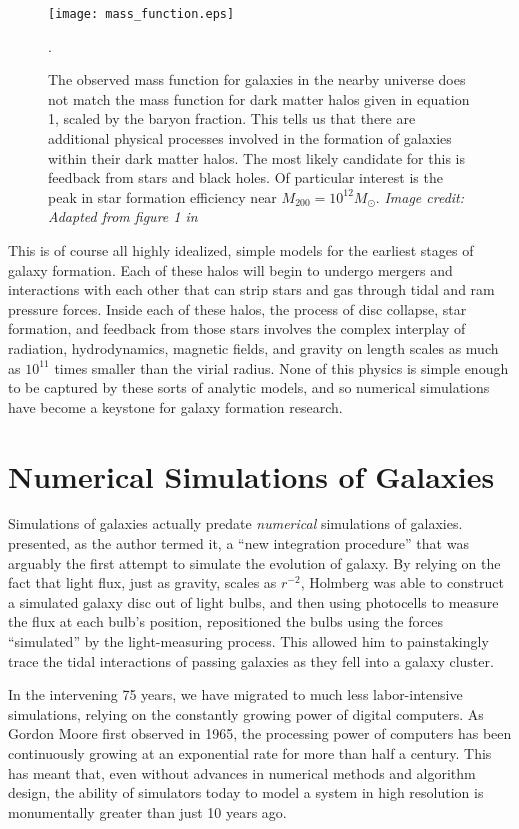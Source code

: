 \begin{figure}
    \texttt{[image: mass\_function.eps]}
    \caption[Galaxy mass function]{The observed mass function for galaxies in
    the nearby universe does not match the mass function for dark matter halos
    given in equation 1, scaled by the baryon fraction.  This tells us that
    there are additional physical processes involved in the formation of
    galaxies within their dark matter halos.  The most likely candidate for
    this is feedback from stars and black holes.  Of particular interest is the
    peak in star formation efficiency near $M_{200}=10^{12}M_\odot$.
    \textit{Image credit: Adapted from figure 1 in \citet{Ferrero2012}}}.
\end{figure}

This is of course all highly idealized, simple models for the earliest stages of
galaxy formation.  Each of these halos will begin to undergo mergers and
interactions with each other that can strip stars and gas through tidal and ram
pressure forces.  Inside each of these halos, the process of disc collapse, star
formation, and feedback from those stars involves the complex interplay of
radiation, hydrodynamics, magnetic fields, and gravity on length scales as much
as $10^{11}$ times smaller than the virial radius.  None of this physics is
simple enough to be captured by these sorts of analytic models, and so numerical
simulations have become a keystone for galaxy formation research.

\section{Numerical Simulations of Galaxies}
Simulations of galaxies actually predate {\it numerical} simulations of
galaxies.  \citet{Holmberg1941} presented, as the author termed it, a ``new
integration procedure'' that was arguably the first attempt to simulate the
evolution of galaxy.  By relying on the fact that light flux, just as gravity,
scales as $r^{-2}$, Holmberg was able to construct a simulated galaxy disc out
of light bulbs, and then using photocells to measure the flux at each bulb's
position, repositioned the bulbs using the forces ``simulated'' by the
light-measuring process.  This allowed him to painstakingly trace the tidal
interactions of passing galaxies as they fell into a galaxy cluster.

In the intervening 75 years, we have migrated to much less labor-intensive
simulations, relying on the constantly growing power of digital computers.  As
Gordon Moore first observed in 1965, the processing power of computers has been
continuously growing at an exponential rate for more than half a century.  This
has meant that, even without advances in numerical methods and algorithm design,
the ability of simulators today to model a system in high resolution is
monumentally greater than just 10 years ago.  

